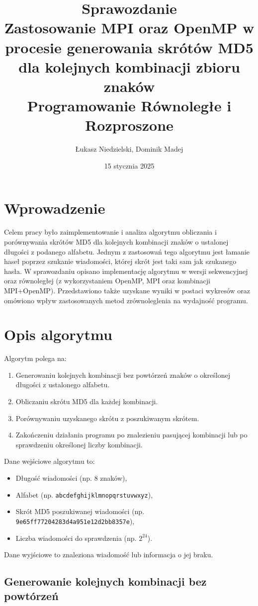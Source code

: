 \documentclass[a4paper,12pt]{article}
\title{
    \textbf{Sprawozdanie} \\
    Zastosowanie MPI oraz OpenMP w procesie generowania skrótów MD5 dla kolejnych kombinacji zbioru znaków \\
    \small Programowanie Równoległe i Rozproszone
}
\author{Łukasz Niedzielski, Dominik Madej}
\date{15 stycznia 2025}
\begin{document}
\maketitle{}

\tableofcontents{}

\newpage

\section{Wprowadzenie}
Celem pracy było zaimplementowanie i analiza algorytmu obliczania i porównywania skrótów MD5 dla kolejnych kombinacji znaków o ustalonej długości z podanego alfabetu. Jednym z zastosowań tego algorytmu jest łamanie haseł poprzez szukanie wiadomości, której skrót jest taki sam jak szukanego hasła. W sprawozdaniu opisano implementację algorytmu w wersji sekwencyjnej oraz równoległej (z wykorzystaniem OpenMP, MPI oraz kombinacji MPI+OpenMP). Przedstawiono także uzyskane wyniki w postaci wykresów oraz omówiono wpływ zastosowanych metod zrównoleglenia na wydajność programu.

\section{Opis algorytmu}
Algorytm polega na:
\begin{enumerate}
	\item Generowaniu kolejnych kombinacji bez powtórzeń znaków o określonej długości z ustalonego alfabetu.
	\item Obliczaniu skrótu MD5 dla każdej kombinacji.
	\item Porównywaniu uzyskanego skrótu z poszukiwanym skrótem.
	\item Zakończeniu działania programu po znalezieniu pasującej kombinacji lub po sprawdzeniu określonej liczby kombinacji.
\end{enumerate}
Dane wejściowe algorytmu to:
\begin{itemize}
	\item Długość wiadomości (np. 8 znaków),
	\item Alfabet (np. \texttt{abcdefghijklmnopqrstuvwxyz}),
	\item Skrót MD5 poszukiwanej wiadomości (np. \texttt{9e65ff77204283d4a951e12d2bb8357e}),
	\item Liczba wiadomości do sprawdzenia (np. $2^{24}$).
\end{itemize}
Dane wyjściowe to znaleziona wiadomość lub informacja o jej braku.

\subsection{Generowanie kolejnych kombinacji bez powtórzeń}
\end{document}
